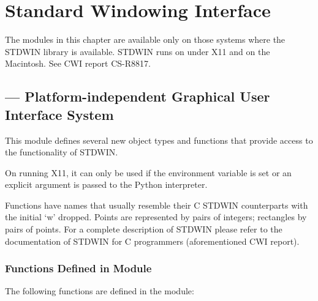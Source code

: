 \chapter{Standard Windowing Interface}

The modules in this chapter are available only on those systems where
the STDWIN library is available.  STDWIN runs on \UNIX{} under X11 and
on the Macintosh.  See CWI report CS-R8817.



\section{ ---
         Platform-independent Graphical User Interface System}



This module defines several new object types and functions that
provide access to the functionality of STDWIN.

On \UNIX{} running X11, it can only be used if the 
environment variable is set or an explicit
  argument is passed to the
Python interpreter.

Functions have names that usually resemble their C STDWIN counterparts
with the initial `w' dropped.  Points are represented by pairs of
integers; rectangles by pairs of points.  For a complete description
of STDWIN please refer to the documentation of STDWIN for C
programmers (aforementioned CWI report).

\subsection{Functions Defined in Module }

The following functions are defined in the  module:

